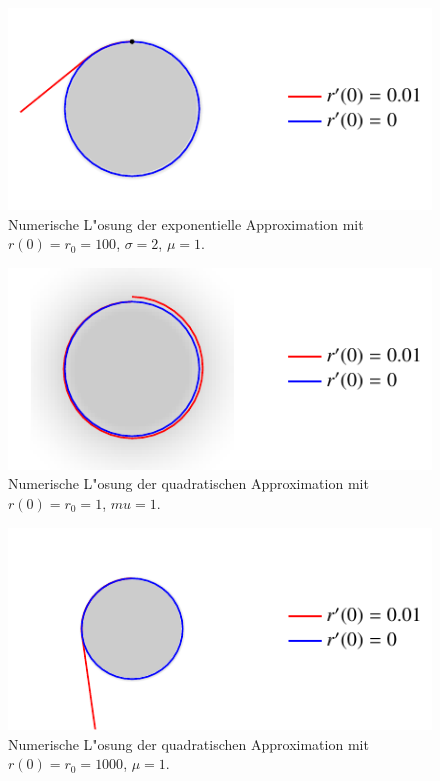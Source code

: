 \begin{refsection}
\begin{figure}
  \centering
  \includegraphics[scale=1]{licht/standalone/fig_kreis_exp2.pdf}
  \caption{Numerische L"osung der exponentielle Approximation mit $r(0) = r_0 = 100$, $\sigma = 2$, $\mu = 1$. \label{fig:sphere_special2}} 
  
\end{figure}

\begin{figure}
  \centering
  \includegraphics[scale=1]{licht/standalone/fig_kreis_square1.pdf}
  \caption{Numerische L"osung der quadratischen Approximation mit $r(0) = r_0 = 1$, $mu = 1$. \label{fig:sphere_special3} }
  
\end{figure}

\begin{figure}
  \centering
  \includegraphics[scale=1]{licht/standalone/fig_kreis_square2.pdf}
  \caption{Numerische L"osung der quadratischen Approximation mit $r(0) = r_0 = 1000$,  $\mu = 1$. \label{fig:sphere_special4} } 
\end{figure}


\end{refsection}

